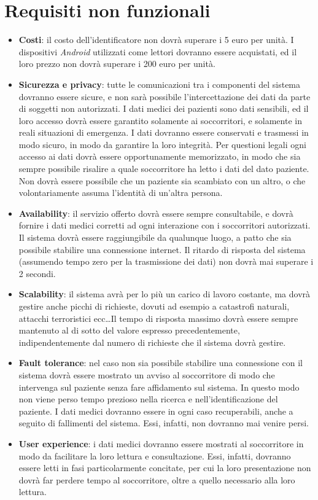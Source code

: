 \documentclass[a4paper,12pt]{report}
\begin{document}
\section{Requisiti non funzionali}
\begin{itemize}
	\item \textbf{Costi}: il costo dell'identificatore non dovrà superare i 5 euro per unità. I dispositivi \emph{Android} utilizzati come lettori dovranno essere acquistati, ed il loro prezzo non dovrà superare i 200 euro per unità.
	\item \textbf{Sicurezza e privacy}: tutte le comunicazioni tra i componenti del sistema dovranno essere sicure, e non sarà possibile l'intercettazione dei dati da parte di soggetti non autorizzati. I dati medici dei pazienti sono dati sensibili, ed il loro accesso dovrà essere garantito solamente ai soccorritori, e solamente in reali situazioni di emergenza. I dati dovranno essere conservati e trasmessi in modo sicuro, in modo da garantire la loro integrità. Per questioni legali ogni accesso ai dati dovrà essere opportunamente memorizzato, in modo che sia sempre possibile risalire a quale soccorritore ha letto i dati del dato paziente. Non dovrà essere possibile che un paziente sia scambiato con un altro, o che volontariamente assuma l'identità di un'altra persona.
	\item \textbf{Availability}: il servizio offerto dovrà essere sempre consultabile, e dovrà fornire i dati medici corretti ad ogni interazione con i soccorritori autorizzati. Il sistema dovrà essere raggiungibile da qualunque luogo, a patto che sia possibile stabilire una connessione internet. Il ritardo di risposta del sistema (assumendo tempo zero per la trasmissione dei dati) non dovrà mai superare i 2 secondi.
	\item \textbf{Scalability}: il sistema avrà per lo più un carico di lavoro costante, ma dovrà gestire anche picchi di richieste, dovuti ad esempio a catastrofi naturali, attacchi terroristici ecc\dots Il tempo di risposta massimo dovrà essere sempre mantenuto al di sotto del valore espresso precedentemente, indipendentemente dal numero di richieste che il sistema dovrà gestire. 
	\item \textbf{Fault tolerance}: nel caso non sia possibile stabilire una connessione con il sistema dovrà essere mostrato un avviso al soccorritore di modo che intervenga sul paziente senza fare affidamento sul sistema. In questo modo non viene perso tempo prezioso nella ricerca e nell'identificazione del paziente. I dati medici dovranno essere in ogni caso recuperabili, anche a seguito di fallimenti del sistema. Essi, infatti, non dovranno mai venire persi. 
	\item \textbf{User experience}: i dati medici dovranno essere mostrati al soccorritore in modo da facilitare la loro lettura e consultazione. Essi, infatti, dovranno essere letti in fasi particolarmente concitate, per cui la loro presentazione non dovrà far perdere tempo al soccorritore, oltre a quello necessario alla loro lettura. 
\end{itemize}
\end{document}
